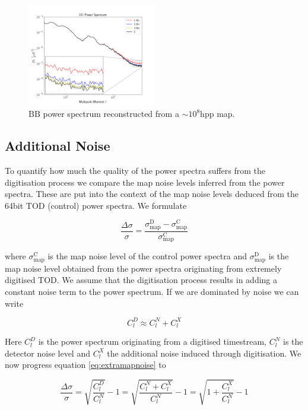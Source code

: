 \documentclass[apj]{emulateapj}
\begin{document}
\begin{figure}[htb]\centering
\includegraphics[width=0.5\textwidth,clip]{Plots/bbzoom.png}
  \caption[Current ]{
  $\mathrm{BB}$ power spectrum reconstructed from a $\sim 10^8\mathrm{hpp}$ map.
\label{fig:bbzoom}
}
\end{figure}

\subsection{Additional Noise}
\label{subsec:additionalnoise}

To quantify how much the quality of the power spectra suffers from the digitisation process we compare the map noise levels inferred from the power spectra. These are put into the context of the map noise levels deduced from the 64bit TOD (control) power spectra. We formulate

\begin{equation} \label{eq:extramapnoise}
\frac{\Delta \sigma}{\sigma} = \frac{\sigma_{\mathrm{map}}^{\mathrm{D}}-\sigma_{\mathrm{map}}^{\mathrm{C}}}{\sigma_{\mathrm{map}}^{\mathrm{C}}}
\end{equation}

where $\sigma_{\mathrm{map}}^{\mathrm{C}}$ is the map noise level of the control power spectra and $\sigma_{\mathrm{map}}^{\mathrm{D}}$ is the map noise level obtained from the power spectra originating from extremely digitised TOD. We assume that the digitisation process results in adding a constant noise term to the power spectrum. If we are dominated by noise we can write

\[ C_l^D \approx C_l^N + C_l^X \]

Here $C_l^D$ is the power spectrum originating from a digitised timestream, $C_l^N$ is the detector noise level and $C_l^X$ the additional noise induced through digitisation. We now progress equation \ref{eq:extramapnoise} to

\[\frac{\Delta \sigma}{\sigma} = \sqrt{\frac{C_l^D}{C_l^{N}}} - 1  = \sqrt{\frac{C_l^N + C_l^X}{C_l^{N}}} - 1 = \sqrt{1 + \frac{C_l^X}{C_l^{N}}} - 1  \]
\end{document}
